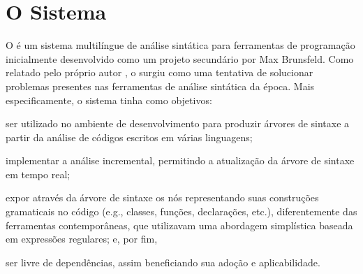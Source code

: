 \documentclass
  [11pt,a4paper,english,brazil,openright,sumario=tradicional,twoside]
  {abntex2}
\begin{document}

  \chapter{O Sistema \treesitter}
  \label{chapter:tree-sitter}

  O \treesitter é um sistema multilíngue de análise sintática para ferramentas
  de programação inicialmente desenvolvido como um projeto secundário por Max
  Brunsfeld. Como relatado pelo próprio autor \cite{github-2017-tree}, o
  \treesitter surgiu como uma tentativa de solucionar problemas presentes nas
  ferramentas de análise sintática da época. Mais especificamente, o sistema
  tinha como objetivos:
  \begin{inparaenum}
    \item ser utilizado no ambiente de desenvolvimento para produzir árvores de
          sintaxe a partir da análise de códigos escritos em várias linguagens;
    \item implementar a análise incremental, permitindo a atualização da árvore
          de sintaxe em tempo real;
    \item expor através da árvore de sintaxe os nós representando suas
          construções gramaticais no código (e.g., classes, funções,
          declarações, etc.), diferentemente das ferramentas contemporâneas,
          que utilizavam uma abordagem simplística baseada em expressões
          regulares; e, por fim,
    \item ser livre de dependências, assim beneficiando sua adoção e
          aplicabilidade.
  \end{inparaenum}
\end{document}
